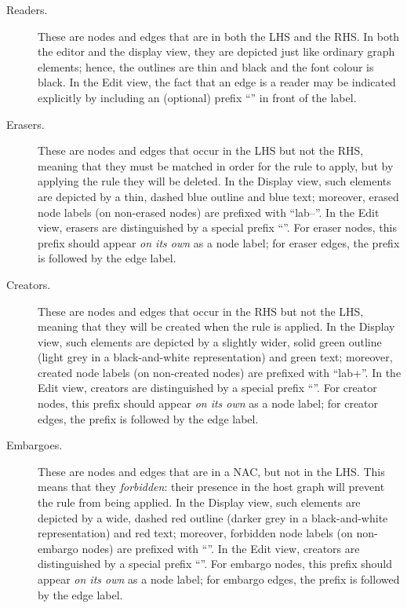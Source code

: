 \begin{description}
\item[Readers.] These are nodes and edges that are in both the LHS and the RHS.
  In both the editor and the display view, they are depicted just like ordinary
  graph elements; hence, the outlines are thin and black and the font colour is
  black. In the Edit view, the fact that an edge is a reader may be indicated
  explicitly by including an (optional) prefix ``\useP'' in front of the label.

\item[Erasers.] These are nodes and edges that occur in the LHS but not the
  RHS, meaning that they must be matched in order for the rule to apply, but by
  applying the rule they will be deleted. In the Display view, such elements
  are depicted by a thin, dashed blue outline and blue text; moreover, erased
  node labels (on non-erased nodes) are prefixed with ``lab{--}''. In the
  Edit view, erasers are distinguished by a special prefix ``\delP''. For
  eraser nodes, this prefix should appear \emph{on its own} as a node label;
  for eraser edges, the prefix is followed by the edge label.

\item[Creators.] These are nodes and edges that occur in the RHS but not the
  LHS, meaning that they will be created when the rule is applied. In the
  Display view, such elements are depicted by a slightly wider, solid green
  outline (light grey in a black-and-white representation) and green text;
  moreover, created node labels (on non-created nodes) are prefixed with
  ``lab{+}''. In the Edit view, creators are distinguished by a special
  prefix ``\newP''. For creator nodes, this prefix should appear \emph{on its
  own} as a node label; for creator edges, the prefix is followed by the edge
  label.

\item[Embargoes.] These are nodes and edges that are in a NAC, but not in the
  LHS. This means that they \emph{forbidden}: their presence in the host graph
  will prevent the rule from being applied. In the Display view, such elements
  are depicted by a wide, dashed red outline (darker grey in a black-and-white
  representation) and red text; moreover, forbidden node labels (on non-embargo
  nodes) are prefixed with ``\lab{!}''. In the Edit view, creators are
  distinguished by a special prefix ``\notP''. For embargo nodes, this prefix
  should appear \emph{on its own} as a node label; for embargo edges, the
  prefix is followed by the edge label.


\end{description}
